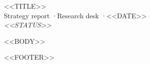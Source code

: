 \documentclass[11pt,a4paper]{article}
\begin{document}
\begin{center}
{\LARGE <<TITLE>>}\\[0.6em]
Strategy report \quad·\quad Research desk \quad·\quad <<DATE>>\\[0.4em]
{\small\textit{<<STATUS>>}}
\end{center}
\vspace{0.4em}
\begin{abstract}
\noindent <<ABSTRACT>>
\end{abstract}

<<BODY>>

\vfill
{\footnotesize\color{gray} <<FOOTER>>}
\end{document}
